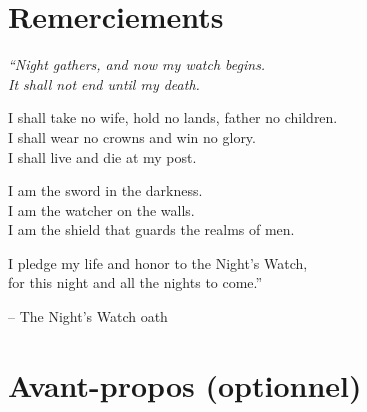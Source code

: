 \documentclass{tnreport}
\begin{document}
\maketitle
{}


\cleardoublepage

\makesecondtitle

\section*{Remerciements}

{\em
``Night gathers, and now my watch begins. \\
It shall not end until my death.

I shall take no wife, hold no lands, father no children. \\
I shall wear no crowns and win no glory. \\
I shall live and die at my post.

I am the sword in the darkness. \\
I am the watcher on the walls. \\
I am the shield that guards the realms of men.

I pledge my life and honor to the Night's Watch, \\
for this night and all the nights to come.''
}

\hspace{4cm} -- The Night's Watch oath


\cleardoublepage

\section*{Avant-propos (optionnel)}


\cleardoublepage

\renewcommand{\baselinestretch}{0.5}\normalsize
\tableofcontents
\renewcommand{\baselinestretch}{1.0}\normalsize
\cleardoublepage

\setcounter{page}{1}
\end{document}
